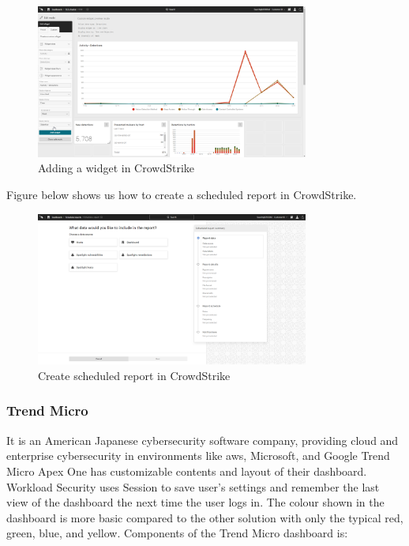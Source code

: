 \begin{figure}[H]
      \centering
      \includegraphics[width=0.8\textwidth]{Figures/CrowdStrike/add-widget.png}
      \caption{Adding a widget in CrowdStrike}
\end{figure}

Figure below shows us how to create a scheduled report in CrowdStrike.

\begin{figure}[H]
      \centering
      \includegraphics[width=0.8\textwidth]{Figures/CrowdStrike/Scheduled_Report.png}
      \caption{Create scheduled report in CrowdStrike}
\end{figure}


\subsubsection{Trend Micro} %
It is an American Japanese cybersecurity software company, providing cloud and enterprise cybersecurity in
environments like \acrshort{aws}, Microsoft, and Google Trend Micro Apex One has customizable contents and
layout of their dashboard. Workload Security uses Session to save user's settings and remember the last view
of the dashboard the next time the user logs in. The colour shown in the dashboard is more basic compared to
the other solution with only the typical red, green, blue, and yellow. Components of the
Trend Micro dashboard is:


